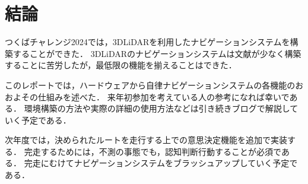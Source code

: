 \section{結論}
つくばチャレンジ2024では，3DLiDARを利用したナビゲーションシステムを構築することができた．
3DLiDARのナビゲーションシステムは文献が少なく構築することに苦労したが，最低限の機能を揃えることはできた．

このレポートでは，ハードウェアから自律ナビゲーションシステムの各機能のおおよその仕組みを述べた．
来年初参加を考えている人の参考になれば幸いである．
環境構築の方法や実際の詳細の使用方法などは引き続きブログで解説していく予定である．

次年度では，決められたルートを走行する上での意思決定機能を追加で実装する．
完走するためには，不測の事態でも，認知判断行動することが必須である．
完走にむけてナビゲーションシステムをブラッシュアップしていく予定である．